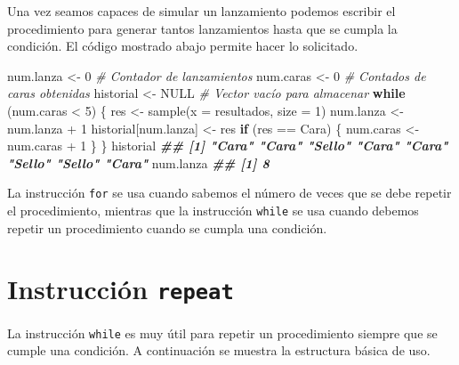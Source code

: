 \documentclass[
]{book}
\makeatletter
\newenvironment{Shaded}{\begin{snugshade}}{\end{snugshade}}
\newcommand{\AttributeTok}[1]{\textcolor[rgb]{0.77,0.63,0.00}{#1}}
\newcommand{\CommentTok}[1]{\textcolor[rgb]{0.56,0.35,0.01}{\textit{#1}}}
\newcommand{\ConstantTok}[1]{\textcolor[rgb]{0.00,0.00,0.00}{#1}}
\newcommand{\ControlFlowTok}[1]{\textcolor[rgb]{0.13,0.29,0.53}{\textbf{#1}}}
\newcommand{\DecValTok}[1]{\textcolor[rgb]{0.00,0.00,0.81}{#1}}
\newcommand{\DocumentationTok}[1]{\textcolor[rgb]{0.56,0.35,0.01}{\textbf{\textit{#1}}}}
\newcommand{\FunctionTok}[1]{\textcolor[rgb]{0.00,0.00,0.00}{#1}}
\newcommand{\NormalTok}[1]{#1}
\newcommand{\OtherTok}[1]{\textcolor[rgb]{0.56,0.35,0.01}{#1}}
\newcommand{\SpecialCharTok}[1]{\textcolor[rgb]{0.00,0.00,0.00}{#1}}
\newcommand{\StringTok}[1]{\textcolor[rgb]{0.31,0.60,0.02}{#1}}
\newenvironment{kframe}{%
\medskip{}
\setlength{\fboxsep}{.8em}
 \def\at@end@of@kframe{}%
 \ifinner\ifhmode%
  \def\at@end@of@kframe{\end{minipage}}%
  \begin{minipage}{\columnwidth}%
 \fi\fi%
 \def\FrameCommand##1{\hskip\@totalleftmargin \hskip-\fboxsep
 \colorbox{shadecolor}{##1}\hskip-\fboxsep
     \hskip-\linewidth \hskip-\@totalleftmargin \hskip\columnwidth}%
 \MakeFramed {\advance\hsize-\width
   \@totalleftmargin\z@ \linewidth\hsize
   \@setminipage}}%
 {\par\unskip\endMakeFramed%
 \at@end@of@kframe}
\newenvironment{rmdblock}[1]
  {
  \begin{itemize}
  \renewcommand{\labelitemi}{
    \raisebox{-.7\height}[0pt][0pt]{
      {\setkeys{Gin}{width=3em,keepaspectratio}\texttt{[image: images/\#1]}}
    }
  }
  \setlength{\fboxsep}{1em}
  \begin{kframe}
  \item
  }
  {
  \end{kframe}
  \end{itemize}
  }
\newenvironment{rmdnote}
  {\begin{rmdblock}{note}}
  {\end{rmdblock}}
\makeatother
\begin{document}
Una vez seamos capaces de simular un lanzamiento podemos escribir el procedimiento para generar tantos lanzamientos hasta que se cumpla la condición. El código mostrado abajo permite hacer lo solicitado.

\begin{Shaded}
\begin{Highlighting}[]
\NormalTok{num.lanza }\OtherTok{\textless{}{-}} \DecValTok{0}     \CommentTok{\# Contador de lanzamientos}
\NormalTok{num.caras }\OtherTok{\textless{}{-}} \DecValTok{0}     \CommentTok{\# Contados de caras obtenidas}
\NormalTok{historial }\OtherTok{\textless{}{-}} \ConstantTok{NULL}  \CommentTok{\# Vector vacío para almacenar}
\ControlFlowTok{while}\NormalTok{ (num.caras }\SpecialCharTok{\textless{}} \DecValTok{5}\NormalTok{) \{}
\NormalTok{  res }\OtherTok{\textless{}{-}} \FunctionTok{sample}\NormalTok{(}\AttributeTok{x =}\NormalTok{ resultados, }\AttributeTok{size =} \DecValTok{1}\NormalTok{)}
\NormalTok{  num.lanza }\OtherTok{\textless{}{-}}\NormalTok{ num.lanza }\SpecialCharTok{+} \DecValTok{1}
\NormalTok{  historial[num.lanza] }\OtherTok{\textless{}{-}}\NormalTok{ res}
  \ControlFlowTok{if}\NormalTok{ (res }\SpecialCharTok{==} \StringTok{\textquotesingle{}Cara\textquotesingle{}}\NormalTok{) \{}
\NormalTok{    num.caras }\OtherTok{\textless{}{-}}\NormalTok{ num.caras }\SpecialCharTok{+} \DecValTok{1}
\NormalTok{  \}}
\NormalTok{\}}
\NormalTok{historial}
\DocumentationTok{\#\# [1] "Cara"  "Cara"  "Sello" "Cara"  "Cara"  "Sello" "Sello" "Cara"}
\NormalTok{num.lanza}
\DocumentationTok{\#\# [1] 8}
\end{Highlighting}
\end{Shaded}

\begin{rmdnote}
La instrucción \texttt{for} se usa cuando sabemos el número de veces que se debe repetir el procedimiento, mientras que la instrucción \texttt{while} se usa cuando debemos repetir un procedimiento cuando se cumpla una condición.
\end{rmdnote}

\hypertarget{instrucciuxf3n-repeat}{%
\section{\texorpdfstring{Instrucción \texttt{repeat}}{Instrucción repeat}}\label{instrucciuxf3n-repeat}}

La instrucción \texttt{while} es muy útil para repetir un procedimiento siempre que se cumple una condición. A continuación se muestra la estructura básica de uso.
\end{document}
